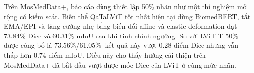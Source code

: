 Trên MosMedData+, báo cáo dùng thiết lập 50\% nhãn như một thí nghiệm mở rộng có kiểm soát. Biến thể QaTaLViT tốt nhất hiện tại dùng BiomedBERT, tắt EMA/EPI và tăng cường nhẹ bằng biến đổi affine và elastic deformation đạt 73.84\% Dice và 60.31\% mIoU sau khi tinh chỉnh ngưỡng. So với LViT-T 50\% được công bố là 73.56\%/61.05\%, kết quả này vượt 0.28 điểm Dice nhưng vẫn thấp hơn 0.74 điểm mIoU. Điều này cho thấy hướng cải thiện trên MosMedData+ đã bắt đầu vượt được mốc Dice của LViT ở cùng mức nhãn.

\begin{table}[!t]
  \centering
  \caption{So sánh bán giám sát trên QaTa-COV19.}
  \label{tab:semi-supervised-results}
\end{table}

